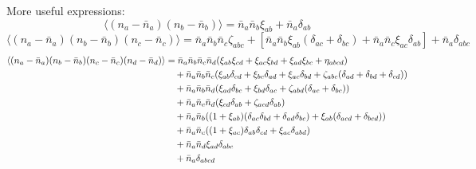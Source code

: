 \documentclass{article}
\newcommand{\nbar}{\bar{n}}
\begin{document}
More useful expressions:
\begin{equation}
    \langle (n_a - \nbar_a) (n_b - \nbar_b) \rangle
        = \nbar_a \nbar_b \xi_{ab} + \nbar_a \delta_{ab}
\end{equation}
\begin{equation}
    \langle (n_a - \nbar_a) (n_b - \nbar_b) (n_c - \nbar_c) \rangle
        = \nbar_a \nbar_b \nbar_c \zeta_{abc} + [\nbar_a \nbar_b \xi_{ab} (\delta_{ac} + \delta_{bc}) + \nbar_a \nbar_c \xi_{ac} \delta_{ab}] + \nbar_a \delta_{abc}
\end{equation}
\begin{align}
    \langle (n_a - \nbar_a) (n_b - \nbar_b) (n_c - \nbar_c) (n_d - \nbar_d) \rangle
        &= \nbar_a \nbar_b \nbar_c \nbar_d (\xi_{ab}\xi_{cd} + \xi_{ac}\xi_{bd} + \xi_{ad}\xi_{bc} + \eta_{abcd}) \notag \\
        &\quad + \nbar_a \nbar_b \nbar_c (\xi_{ab} \delta_{cd} + \xi_{bc} \delta_{ad} + \xi_{ac} \delta_{bd} + \zeta_{abc}(\delta_{ad} + \delta_{bd} + \delta_{cd})) \notag \\
        &\quad + \nbar_a \nbar_b \nbar_d (\xi_{ad} \delta_{bc} + \xi_{bd} \delta_{ac} + \zeta_{abd}(\delta_{ac} + \delta_{bc})) \notag \\
        &\quad + \nbar_a \nbar_c \nbar_d (\xi_{cd} \delta_{ab} + \zeta_{acd} \delta_{ab}) \notag \\
        &\quad + \nbar_a \nbar_b ((1 + \xi_{ab})(\delta_{ac} \delta_{bd} + \delta_{ad} \delta_{bc}) + \xi_{ab} (\delta_{acd} + \delta_{bcd})) \notag \\
        &\quad + \nbar_a \nbar_c ((1 + \xi_{ac}) \delta_{ab} \delta_{cd} + \xi_{ac} \delta_{abd}) \notag \\
        &\quad + \nbar_a \nbar_d \xi_{ad} \delta_{abc} \notag \\
        &\quad + \nbar_a \delta_{abcd}
\end{align}
\end{document}

